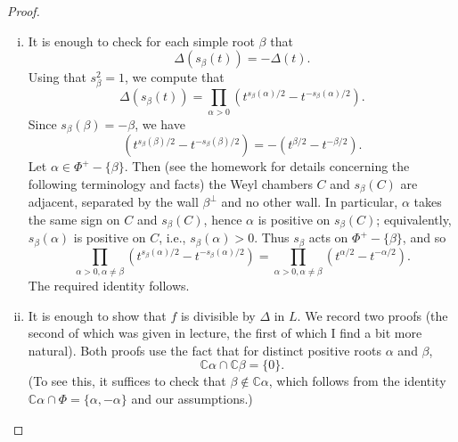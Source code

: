 \documentclass[reqno]{amsart} 
\begin{document}
\begin{proof}
  \begin{enumerate}
[(i)]
  \item It is enough to check for each simple root $\beta$ that
    \begin{equation*}
      \Delta(s_\beta(t)) = - \Delta(t).
    \end{equation*}
    Using that $s_\beta^2 =1$, we compute that
    \begin{equation*}
      \Delta(s_\beta(t))
      =
      \prod_{\alpha>0}
      (t^{s_\beta(\alpha)/2}
      - t^{-s_\beta(\alpha)/2}).
    \end{equation*}
    Since $s_\beta(\beta) = -\beta$, we have
    \begin{equation*}
      (t^{s_\beta(\beta)/2}
      - t^{-s_\beta(\beta)/2})
      =
      -(t^{\beta/2} - t^{-\beta/2}).
    \end{equation*}
    Let $\alpha \in \Phi^+ - \{\beta\}$.  Then (see the homework for details concerning the following terminology and facts) the Weyl chambers $C$ and $s_\beta(C)$ are adjacent, separated by the wall $\beta^\perp$ and no other wall.  In particular, $\alpha$ takes the same sign on $C$ and $s_\beta(C)$, hence $\alpha$ is positive on $s_\beta(C)$; equivalently, $s_\beta(\alpha)$ is positive on $C$, i.e., $s_\beta(\alpha) > 0$.  Thus $s_\beta$ acts on $\Phi^+ - \{\beta\}$, and so
    \begin{equation*}
      \prod_{\alpha>0, \alpha \neq \beta }
      (t^{s_\beta(\alpha)/2}
      - t^{-s_\beta(\alpha)/2})
      =
      \prod_{\alpha>0, \alpha \neq \beta }
      (t^{\alpha/2}
      - t^{-\alpha/2}).
    \end{equation*}
    The required identity follows.
  \item It is enough to show that $f$ is divisible by $\Delta$ in $L$.  We record two proofs (the second of which was given in lecture, the first of which I find a bit more natural).  Both proofs use the fact that for distinct positive roots $\alpha$ and $\beta$,
    \begin{equation}\label{eq:C-alpha-not-C-beta}
      \mathbb{C} \alpha \cap \mathbb{C} \beta = \{0\}.
    \end{equation}
    (To see this, it suffices to check that $\beta \notin \mathbb{C} \alpha$, which follows from the identity $\mathbb{C} \alpha \cap \Phi = \{\alpha, - \alpha \}$ and our assumptions.)
    \begin{enumerate}

\end{enumerate}
\end{enumerate}
\end{proof}
\end{document}
